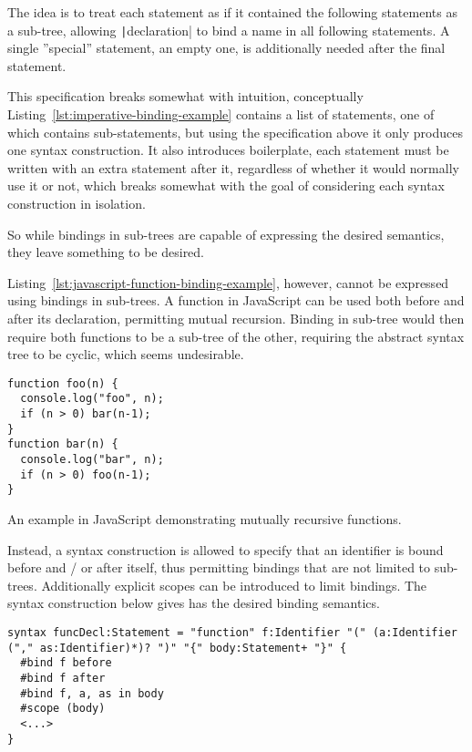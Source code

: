 \documentclass{kththesis}
\begin{document}
The idea is to treat each statement as if it contained the following statements as a sub-tree, allowing \texttt|declaration| to bind a name in all following statements. A single ''special'' statement, an empty one, is additionally needed after the final statement.

This specification breaks somewhat with intuition, conceptually Listing~\ref{lst:imperative-binding-example} contains a list of statements, one of which contains sub-statements, but using the specification above it only produces one syntax construction. It also introduces boilerplate, each statement must be written with an extra statement after it, regardless of whether it would normally use it or not, which breaks somewhat with the goal of considering each syntax construction in isolation.

So while bindings in sub-trees are capable of expressing the desired semantics, they leave something to be desired.

Listing~\ref{lst:javascript-function-binding-example}, however, cannot be expressed using bindings in sub-trees. A function in JavaScript can be used both before and after its declaration, permitting mutual recursion. Binding in sub-tree would then require both functions to be a sub-tree of the other, requiring the abstract syntax tree to be cyclic, which seems undesirable.

\begin{listing}
\begin{verbatim}
function foo(n) {
  console.log("foo", n);
  if (n > 0) bar(n-1);
}
function bar(n) {
  console.log("bar", n);
  if (n > 0) foo(n-1);
}
\end{verbatim}
\caption{An example in JavaScript demonstrating mutually recursive functions.}
\label{lst:javascript-function-binding-example}
\end{listing}

Instead, a syntax construction is allowed to specify that an identifier is bound before and / or after itself, thus permitting bindings that are not limited to sub-trees. Additionally explicit scopes can be introduced to limit bindings. The syntax construction below gives has the desired binding semantics.

\begin{verbatim}
syntax funcDecl:Statement = "function" f:Identifier "(" (a:Identifier ("," as:Identifier)*)? ")" "{" body:Statement+ "}" {
  #bind f before
  #bind f after
  #bind f, a, as in body
  #scope (body)
  <...>
}
\end{verbatim}
\end{document}
